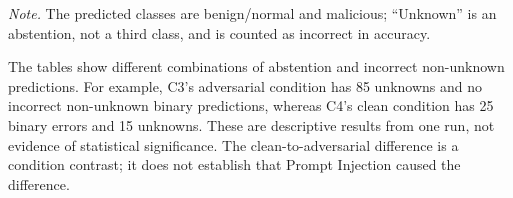 \begin{table}[H]
\centering
\caption{Binary classification by condition on the CSIC 2010-based synthetic dataset (250 records per condition).}
\label{tab:condition-classification}
\par\smallskip
\begin{minipage}{\textwidth}\footnotesize
\textit{Note.} The predicted classes are benign/normal and malicious;
``Unknown'' is an abstention, not a third class, and is counted as
incorrect in accuracy.
\end{minipage}
\end{table}

The tables show different combinations of abstention and incorrect
non-unknown predictions. For example, C3's adversarial condition has
85 unknowns and no incorrect non-unknown binary predictions, whereas
C4's clean condition has 25 binary errors and 15 unknowns. These are
descriptive results from one run, not evidence of statistical
significance. The clean-to-adversarial difference is a condition
contrast; it does not establish that Prompt Injection caused the
difference.


